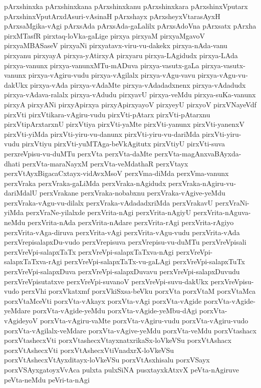 {pArxshinxka
pArxshinxkana
pArxshinxkanu
pArxshinxkara
pArxshinxVputarx
pArxshinxVputArxdAsuri-vAsinaH
pArxshayx
pArxsheyxVtarasAyxH
pArxsaMgika-vAgi
pArxsAda
pArxsAda-gaLalilx
pArxsAdoVna
pArxsatx
pArxha
pirxMTasfR
pirxtaq-loVka-gaLige
pirxya
pirxyaM
pirxyaMgavoV
pirxyaMBASaseV
pirxyaNi
pirxyatavx-viru-vu-dakekx
pirxya-nAda-vanu
pirxyanu
pirxyayA
pirxya-yAtirxyA
pirxyaru
pirxya-LAgidudx
pirxya-LAda
pirxya-vanunx
pirxya-vanunxMTu-mADuva
pirxya-vasutx-gaLa
pirxya-vasutx-vanunx
pirxya-vAgiru-vudu
pirxya-vAgilalx
pirxya-vAgu-vavu
pirxya-vAgu-vu-dakUkx
pirxya-vAda
pirxya-vAdaMte
pirxya-vAdadadxnenx
pirxya-vAdadudx
pirxya-vAdava-ralalx
pirxya-vAdudu
pirxyavU
pirxya-veMdu
pirxya-suKa-vanunx
pirxyA
pirxyANi
pirxyApirxya
pirxyApirxyayoV
pirxyeyU
pirxyoV
pirxVNayeVdf
pirxVti
pirxVtikara-vAgiru-vudu
pirxVti-pAtarx
pirxVti-pAtarxnu
pirxVtipArxtarxnU
pirxVtiya
pirxVti-yaMte
pirxVti-yanunx
pirxVti-yanenxV
pirxVti-yiMda
pirxVti-yiru-vu-danunx
pirxVti-yiru-vu-dariMda
pirxVti-yiru-vudu
pirxVtiyu
pirxVti-yuMTAga-beVkAgitutx
pirxVtiyU
pirxVti-suva
perxreVpisu-vu-duMTu
perxVta
perxVta-daMte
perxVta-magAnxvaBAyxda-dhati
perxVta-maraNayxM
perxVta-veMdathaR
perxVtayx
perxVtAyxBigacaCxtayx-vidAvxMsoV
perxVma-diMda
perxVma-vanunx
perxVraka
perxVraka-gaLiMda
perxVraka-nAgidudx
perxVraka-nAgiru-vu-dariMdalU
perxVrakane
perxVraka-nobabxnu
perxVraka-vAgive-yeMdu
perxVraka-vAgu-vu-dilalx
perxVraka-vAdadadxriMda
perxVrakavU
perxVraNi-yiMda
perxVraNe-yilalxde
perxVrita-nAgi
perxVrita-nAgiyU
perxVrita-nAguva-neMdu
perxVrita-nAda
perxVrita-nAdare
perxVrita-rAgi
perxVrita-rAgiyo
perxVrita-vAga-diruva
perxVrita-vAgi
perxVrita-vAgu-vudu
perxVrita-vAda
perxVrepisalapxDu-vudo
perxVrepisuva
perxVrepisu-vu-duMTu
perxVreVpisali
perxVreVpi-salapxTaTx
perxVreVpi-salapxTaTxva-nAgi
perxVreVpi-salapxTaTxva-rAgi
perxVreVpi-salapxTaTx-vu-gaLAgi
perxVreVpi-salapxTuTx
perxVreVpi-salapxDuva
perxVreVpi-salapxDuvavu
perxVreVpi-salapxDuvudu
perxVreVpisutatxve
perxVreVpi-suvanoV
perxVreVpi-suvu-dakUkx
perxVreVpisu-vudo
perxVhi
porxVkatxmf
porxVkiSxsa-beVku
porxVta
porxVtaM
porxVtaMca
porxVtaMceVti
porxVta-vAkayx
porxVta-vAgi
porxVta-vAgide
porxVta-vAgide-yeMdare
porxVta-vAgide-yeMdu
porxVta-vAgide-yeMbu-dAgi
porxVta-vAgideyoV
porxVta-vAgiru-vaMte
porxVta-vAgiru-vudu
porxVta-vAgiru-vudo
porxVta-vAgilalx-veMdare
porxVta-vAgive-yeMdu
porxVta-veMdu
porxVtashacx
porxVtashecxVti
porxVtashecxVtayxnatxrikaSx-loVkeVSu
porxVtAshacx
porxVtAshecxVti
porxVtAshecxVtiVnadxrX-loVkeVSu
porxVtAshecxVtAyxditayx-loVkeVSu
porxVtAsxhisalu
porxVSayx
porxVSAyxgatoyxVvAca
pulxta
pulxSiNA
pusxtayxkAtxvX
peVta-nAgiruve
peVta-neMdu
peVri-ta-nAgi
}
